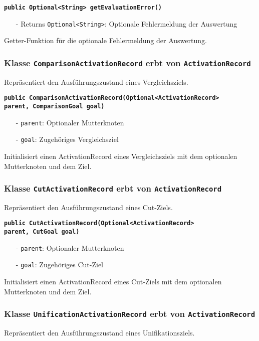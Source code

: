 \documentclass[parskip=full,11pt,twoside]{scrartcl}
\begin{document}
\textbf{\texttt{public Optional<String> getEvaluationError()}}
\begin{itemize}[noitemsep]
	\item[-] Returns \texttt{Optional<String>}: Optionale Fehlermeldung der Auswertung
\end{itemize}
Getter-Funktion für die optionale Fehlermeldung der Auswertung.

\subsubsection{Klasse \texttt{ComparisonActivationRecord} erbt von \texttt{ActivationRecord}}
Repräsentiert den Ausführungszustand eines Vergleichsziels.

\textbf{\texttt{public ComparisonActivationRecord(Optional<ActivationRecord>\\ parent, ComparisonGoal goal)}}
\begin{itemize}[noitemsep]
	\item[-] \texttt{parent}: Optionaler Mutterknoten
	\item[-] \texttt{goal}: Zugehöriges Vergleichsziel
\end{itemize}
Initialisiert einen ActivationRecord eines Vergleichsziels mit dem optionalen Mutterknoten und dem Ziel.

\subsubsection{Klasse \texttt{CutActivationRecord} erbt von \texttt{ActivationRecord}}
Repräsentiert den Ausführungszustand eines Cut-Ziels.

\textbf{\texttt{public CutActivationRecord(Optional<ActivationRecord>\\ parent, CutGoal goal)}}
\begin{itemize}[noitemsep]
	\item[-] \texttt{parent}: Optionaler Mutterknoten
	\item[-] \texttt{goal}: Zugehöriges Cut-Ziel
\end{itemize}
Initialisiert einen ActivationRecord eines Cut-Ziels mit dem optionalen Mutterknoten und dem Ziel.

\subsubsection{Klasse \texttt{UnificationActivationRecord} erbt von \texttt{ActivationRecord}}
Repräsentiert den Ausführungszustand eines Unifikationsziels.
\end{document}

